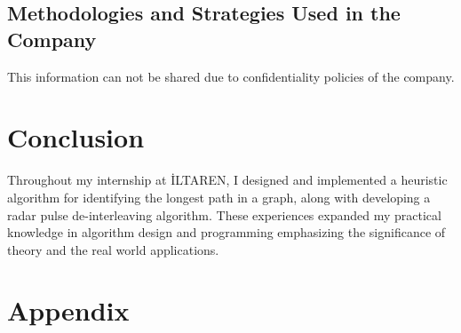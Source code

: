\documentclass[12pt]{report}
\begin{document}
    \section{Methodologies and Strategies Used in the Company}
    
    This information can not be shared due to confidentiality policies of the company.

\chapter{Conclusion}
Throughout my internship at İLTAREN, I designed and implemented a heuristic algorithm for identifying the longest path in a graph, along with developing a radar pulse de-interleaving algorithm. These experiences expanded my
practical knowledge in algorithm design and programming emphasizing the significance of theory and the real world applications. 
\chapter{Appendix}
\end{document}
